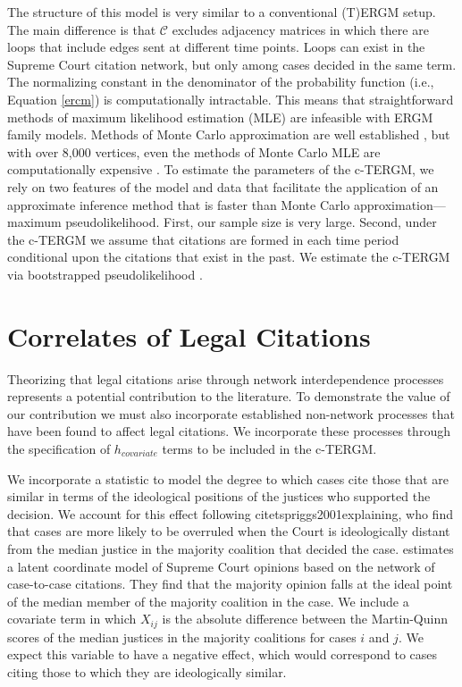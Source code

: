 \documentclass[headsepline=true, abstracton]{scrartcl}
\begin{document}
The structure of this model is very similar to a conventional (T)ERGM setup. The main difference is that  $\mathcal{C}$ excludes adjacency matrices in which there are loops that include edges sent at different time points. Loops can exist in the Supreme Court citation network, but only among cases decided in the same term. The normalizing constant in the denominator of the probability function (i.e., Equation \ref{ercm}) is computationally intractable. This means that straightforward methods of maximum likelihood estimation (MLE) are infeasible with ERGM family models. Methods of Monte Carlo approximation are well established \citep{hunter2006inference,van2009framework,hummel2012improving}, but with over 8,000 vertices, even the methods of Monte Carlo MLE are computationally expensive \citep{schmid2017exponential}. To estimate the parameters of the c-TERGM, we rely on two features of the model and data that facilitate the application of an approximate inference method that is faster than Monte Carlo approximation---maximum pseudolikelihood. First, our sample size is very large. Second, under the c-TERGM we assume that citations are formed in each time period conditional upon the citations that exist in the past.  We estimate the c-TERGM via bootstrapped pseudolikelihood \citep{desmarais2012statistical,desmarais2010consistent}. 




\section{Correlates of Legal Citations}

Theorizing that legal citations arise through network interdependence processes represents a potential contribution to the literature. To demonstrate the value of our contribution we must also incorporate established non-network processes that have been found to affect legal citations. We incorporate these processes through the specification of $h_{covariate}$  terms to be included in the c-TERGM. 

We incorporate a statistic to model the degree to which cases cite those that are similar in terms of the ideological positions of the justices who supported the decision. We account for this effect following citet{spriggs2001explaining}, who find that cases are more likely to be overruled when the Court is ideologically distant from the median justice in the majority coalition that decided the case. \citet{clark2010locating} estimates a latent coordinate model of Supreme Court opinions based on the network of case-to-case citations. They find that the majority opinion falls at the ideal point of the median member of the majority coalition in the case. We include a covariate term in which $X_{ij}$ is the absolute difference between the Martin-Quinn scores \citep{martin2002dynamic} of the median justices in the majority coalitions for cases $i$ and $j$. We expect this variable to have a negative effect, which would correspond to cases citing those to which they are ideologically similar.%
\end{document}
